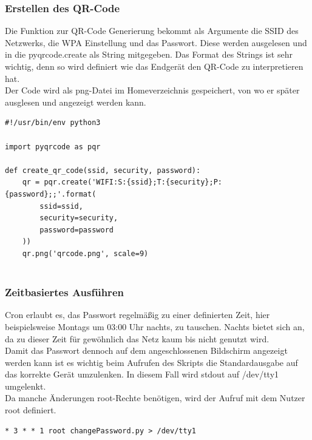\documentclass[a4paper,11pt,singlespacing]{article}
\begin{document}
    		\subsubsection{Erstellen des QR-Code}
    				Die Funktion zur QR-Code Generierung bekommt als Argumente die SSID des Netzwerks, die WPA Einstellung und das Passwort. Diese werden ausgelesen und in die pyqrcode.create als String mitgegeben. Das Format des Strings ist sehr wichtig, denn so wird definiert wie das Endgerät den QR-Code zu interpretieren hat.  \\
				Der Code wird als png-Datei im Homeverzeichnis gespeichert, von wo er später ausglesen und angezeigt werden kann.\\ 


\begin{lstlisting}
#!/usr/bin/env python3

import pyqrcode as pqr
	
def create_qr_code(ssid, security, password):
    qr = pqr.create('WIFI:S:{ssid};T:{security};P:{password};;'.format(
        ssid=ssid,
        security=security,
        password=password
    ))
    qr.png('qrcode.png', scale=9)
    
\end{lstlisting}
    	
    		\subsubsection{Zeitbasiertes Ausführen}
    			Cron erlaubt es, das Passwort regelmäßig zu einer definierten Zeit, hier beispielsweise Montags um 03:00 Uhr nachts, zu tauschen. Nachts bietet sich an, da zu dieser Zeit für gewöhnlich das Netz kaum bis nicht genutzt wird. \\
    			Damit das Passwort dennoch auf dem angeschlossenen Bildschirm angezeigt werden kann ist es wichtig beim Aufrufen des Skripts die Standardausgabe auf das korrekte Gerät umzulenken. In diesem Fall wird stdout auf /dev/tty1 umgelenkt. \\
    			Da manche Änderungen root-Rechte benötigen, wird der Aufruf mit dem Nutzer root definiert.
    			\begin{lstlisting}
* 3 * * 1 root changePassword.py > /dev/tty1
    			\end{lstlisting}
    		
\end{document}
